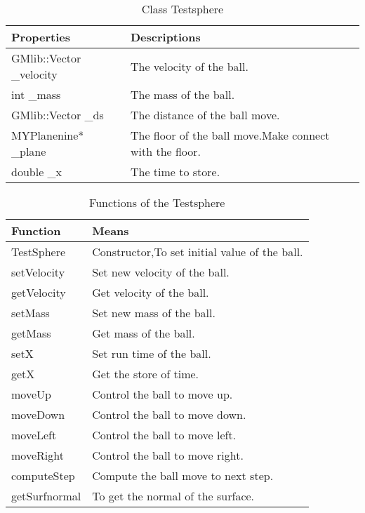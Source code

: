 \documentclass[a4,10pt]{article}
\begin{document}
\begin{table}[H]
\centering
\caption{Class Testsphere}
\label{my-label}
\begin{tabular}{ll}
\hline
\multicolumn{1}{|l|}{\textbf{Properties}}        & \multicolumn{1}{l|}{\textbf{Descriptions}}                                   \\ \hline
\multicolumn{1}{|l|}{GMlib::Vector \_velocity}   & \multicolumn{1}{l|}{The velocity of the ball.}                               \\ \hline
\multicolumn{1}{|l|}{int \_mass}                 & \multicolumn{1}{l|}{The mass of the ball.}                                   \\ \hline
\multicolumn{1}{|l|}{GMlib::Vector \_ds}         & \multicolumn{1}{l|}{The distance of the ball move.}                          \\ \hline
\multicolumn{1}{|l|}{MYPlanenine* \_plane}       & \multicolumn{1}{l|}{The floor of the ball move.Make connect with the floor.} \\ \hline
\multicolumn{1}{|l|}{double \_x}                 & \multicolumn{1}{l|}{The time to store.}                                      \\ \hline

\end{tabular}
\end{table}

\begin{table}[H]
\centering
\caption{Functions of the Testsphere}
\label{my-label}
\begin{tabular}{|l|l|}
\hline
\textbf{Function} & \textbf{Means}                                \\ \hline
TestSphere        & Constructor,To set initial value of the ball. \\ \hline
setVelocity       & Set new velocity of the ball.                 \\ \hline
getVelocity       & Get velocity of the ball.                     \\ \hline
setMass           & Set new mass of the ball.                     \\ \hline
getMass           & Get mass of the ball.                         \\ \hline
setX              & Set run time of the ball.                     \\ \hline
getX              & Get the store of time.                        \\ \hline
moveUp            & Control the ball to move up.                  \\ \hline
moveDown          & Control the ball to move down.                \\ \hline
moveLeft          & Control the ball to move left.                \\ \hline
moveRight         & Control the ball to move right.               \\ \hline
computeStep       & Compute the ball move to next step.           \\ \hline
getSurfnormal     & To get the normal of the surface.             \\ \hline
\end{tabular}
\end{table}
\end{document}
